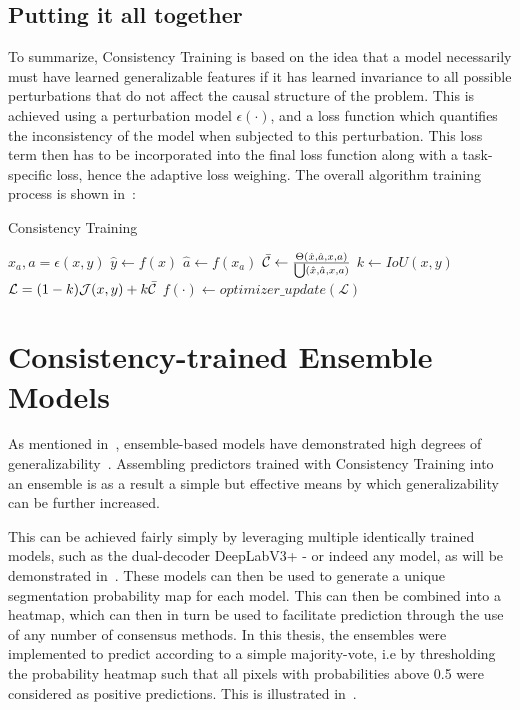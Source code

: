 \subsection{Putting it all together}
To summarize, Consistency Training is based on the idea that a model necessarily must have learned generalizable features if it has learned invariance to all possible perturbations that do not affect the causal structure of the problem. This is achieved using a perturbation model \(\epsilon(\cdot)\), and a loss function which quantifies the inconsistency of the model when subjected to this perturbation. This loss term then has to be incorporated into the final loss function along with a task-specific loss, hence the adaptive loss weighing. The overall algorithm training process is shown in~:
\begin{algorithm}[htb]
    \caption{Consistency Training}\label{alg:consistency}
    \begin{algorithmic}
        \State $x_a, a = \epsilon(x, y)$
        \State $\hat{y} \gets f(x)$
        \State $\hat{a} \gets f(x_a)$
        \State $\Bar{\mathcal{C}} \gets \frac{\Theta(\hat{x}, \hat{a},x,a)}{\bigcup(\hat{x}, \hat{a},x,a)}$
        \State $k \gets IoU(x,y)$
        \State $\mathcal{L} = (1-k) \mathcal{J}(x,y) + k \Bar{\mathcal{C}}$
        \State $f(\cdot) \gets optimizer\_update(\mathcal{L})$
        \EndFor
    \EndFor
    \end{algorithmic}
\end{algorithm}


\section{Consistency-trained Ensemble Models}
As mentioned in~, ensemble-based models have demonstrated high degrees of generalizability~\cite{divergentnets, endoensemble}. Assembling predictors trained with Consistency Training into an ensemble is as a result a simple but effective means by which generalizability can be further increased. 

This can be achieved fairly simply by leveraging multiple identically trained models, such as the dual-decoder DeepLabV3+ - or indeed any model, as will be demonstrated in~. These models can then be used to generate a unique segmentation probability map for each model. This can then be combined into a heatmap, which can then in turn be used to facilitate prediction through the use of any number of consensus methods. In this thesis, the ensembles were implemented to predict according to a simple majority-vote, i.e by thresholding the probability heatmap such that all pixels with probabilities above 0.5 were considered as positive predictions. This is illustrated in~.

